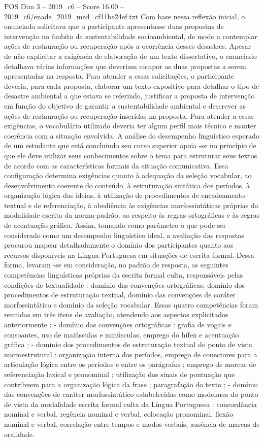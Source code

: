 \begin{textsample}{POS Dim 3 – 2019\_c6 – Score 16.00 – 2019\_c6/enade\_2019\_med\_cf41be24ef.txt}
Com base nessa reflexão inicial, o enunciado solicitava que o participante apresentasse duas propostas de intervenção no âmbito da sustentabilidade socioambiental, de modo a contemplar ações de restauração ou recuperação após a ocorrência desses desastres.
Apesar de não explicitar a exigência de elaboração de um texto dissertativo, o enunciado detalhava várias informações que deveriam compor as duas propostas a serem apresentadas na resposta.
Para atender a essas solicitações, o participante deveria, para cada proposta, elaborar um texto expositivo para detalhar o tipo de desastre ambiental a que estava se referindo, justificar a proposta de intervenção em função do objetivo de garantir a sustentabilidade ambiental e descrever as ações de restauração ou recuperação inseridas na proposta.
Para atender a essas exigências, o vocabulário utilizado deveria ter algum perfil mais técnico e manter coerência com a situação envolvida.
A análise do desempenho linguístico esperado de um estudante que está concluindo seu curso superior apoia -se no princípio de que ele deve utilizar seus conhecimentos sobre o tema para estruturar seus textos de acordo com as características formais da situação comunicativa.
Essa configuração determina exigências quanto à adequação da seleção vocabular, ao desenvolvimento coerente do conteúdo, à estruturação sintática dos períodos, à organização lógica das ideias, à utilização de procedimentos de encadeamento textual e de referenciação, à obediência às exigências morfossintáticas próprias da modalidade escrita da norma-padrão, ao respeito às regras ortográficas e às regras de acentuação gráfica.
Assim, tomando como parâmetro o que pode ser considerado como um desempenho linguístico ideal, a avaliação das respostas procurou mapear detalhadamente o domínio dos participantes quanto aos recursos disponíveis na Língua Portuguesa em situações de escrita formal.
Dessa forma, levaram -se em consideração, no padrão de resposta, as seguintes competências linguísticas próprias da escrita formal culta, responsáveis pelas condições de textualidade : domínio das convenções ortográficas, domínio dos procedimentos de estruturação textual, domínio das convenções de caráter morfossintático e domínio da seleção vocabular.
Essas quatro competências foram reunidas em três itens de avaliação, atendendo aos aspectos explicitados anteriormente : - domínio das convenções ortográficas : grafia de vogais e consoantes, uso de maiúsculas e minúsculas, emprego do hífen e acentuação gráfica ; - domínio dos procedimentos de estruturação textual do ponto de vista microestrutural : organização interna dos períodos, emprego de conectores para a articulação lógica entre os períodos e entre os parágrafos ; emprego de marcas de referenciação lexical e pronominal ; utilização dos sinais de pontuação que contribuem para a organização lógica da frase ; paragrafação do texto ; - domínio das convenções de caráter morfossintático estabelecidas como modelares do ponto de vista da modalidade escrita formal culta da Língua Portuguesa : concordância nominal e verbal, regência nominal e verbal, colocação pronominal, flexão nominal e verbal, correlação entre tempos e modos verbais, ausência de marcas de oralidade.

\end{textsample}
